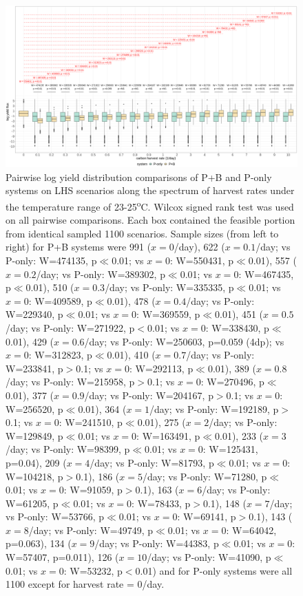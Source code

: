 \documentclass[../thesis.tex]{subfiles} %
\begin{document}
\begin{figure}[H]
    \centering
    \includegraphics[width=\linewidth]{../result/Wilcox.png}
    \caption[Pairwise log yield comparisons]{Pairwise log yield distribution comparisons of P+B and P-only systems on LHS scenarios along the spectrum of harvest rates under the temperature range of 23-25\textsuperscript{o}C.  {\scriptsize Wilcox signed rank test was used on all pairwise comparisons.  Each box contained the feasible portion from identical sampled 1100 scenarios.  Sample sizes (from left to right) for P+B systems were 991 ($x=0$/day), 622 ($x=0.1$/day; vs P-only: W=474135, p$\ll$0.01; vs $x=0$: W=550431, p$\ll$0.01), 557 ($x=0.2$/day; vs P-only: W=389302, p$\ll$0.01; vs $x=0$: W=467435, p$\ll$0.01), 510 ($x=0.3$/day; vs P-only: W=335335, p$\ll$0.01; vs $x=0$: W=409589, p$\ll$0.01), 478 ($x=0.4$/day; vs P-only: W=229340, p$\ll$0.01; vs $x=0$: W=369559, p$\ll$0.01), 451 ($x=0.5$/day; vs P-only: W=271922, p$<$0.01; vs $x=0$: W=338430, p$\ll$0.01), 429 ($x=0.6$/day; vs P-only: W=250603, p=0.059 (4dp); vs $x=0$: W=312823, p$\ll$0.01), 410 ($x=0.7$/day; vs P-only: W=233841, p$>$0.1; vs $x=0$: W=292113, p$\ll$0.01), 389 ($x=0.8$/day; vs P-only: W=215958, p$>$0.1; vs $x=0$: W=270496, p$\ll$0.01), 377 ($x=0.9$/day; vs P-only: W=204167, p$>$0.1; vs $x=0$: W=256520, p$\ll$0.01), 364 ($x=1$/day; vs P-only: W=192189, p$>$0.1; vs $x=0$: W=241510, p$\ll$0.01), 275 ($x=2$/day; vs P-only: W=129849, p$\ll$0.01; vs $x=0$: W=163491, p$\ll$0.01), 233 ($x=3$/day; vs P-only: W=98399, p$\ll$0.01; vs $x=0$: W=125431, p=0.04), 209 ($x=4$/day; vs P-only: W=81793, p$\ll$0.01; vs $x=0$: W=104218, p$>$0.1), 186 ($x=5$/day; vs P-only: W=71280, p$\ll$0.01; vs $x=0$: W=91059, p$>$0.1), 163 ($x=6$/day; vs P-only: W=61205, p$\ll$0.01; vs $x=0$: W=78433, p$>$0.1), 148 ($x=7$/day; vs P-only: W=53766, p$\ll$0.01; vs $x=0$: W=69141, p$>$0.1), 143 ($x=8$/day; vs P-only: W=49749, p$\ll$0.01; vs $x=0$: W=64042, p=0.063), 134 ($x=9$/day; vs P-only: W=44383, p$\ll$0.01; vs $x=0$: W=57407, p=0.011), 126 ($x=10$/day; vs P-only: W=41090, p$\ll$0.01; vs $x=0$: W=53232, p$<$0.01) and for P-only systems were all 1100 except for harvest rate = 0/day.}}
    \label{fig:wilcox}
\end{figure}
\end{document}
